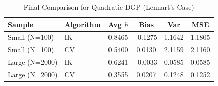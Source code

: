 \begin{table}[h]
\centering
\caption{Final Comparison for Quadratic DGP (Lennart's Case)}
\begin{tabular}{llcccc}
\hline
Sample & Algorithm & Avg $h$ & Bias & Var & MSE \\
\hline
Small (N=100) & IK & 0.8465 & -0.1275 & 1.1642 & 1.1805 \\
Small (N=100) & CV & 0.5400 & 0.0130 & 2.1159 & 2.1160 \\
\hline
Large (N=2000) & IK & 0.6241 & -0.0033 & 0.0585 & 0.0585 \\
Large (N=2000) & CV & 0.3555 & 0.0207 & 0.1248 & 0.1252 \\
\hline
\end{tabular}
\label{tab:lennart_final}
\end{table}
